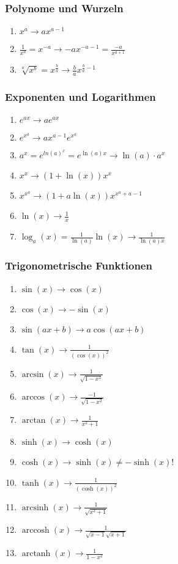 \documentclass[a4paper, 9pt, DIV=24]{scrartcl}
\DeclareMathOperator{\arcsinh}{arcsinh}
\DeclareMathOperator{\arccosh}{arccosh}
\DeclareMathOperator{\arctanh}{arctanh}
\begin{document}
\subsubsection{Polynome und Wurzeln}
\begin{enumerate}[label={(}\arabic*{)}]
 \item $x^a \rightarrow ax^{a-1}$
 \item $\frac{1}{x^a} = x^{-a} \rightarrow -ax^{-a-1} = \frac{-a}{x^{a+1}}$
 \item $\sqrt[a]{x^b} = x^{\frac{b}{a}} \rightarrow \frac{b}{a}x^{\frac{b}{a}-1}$
\end{enumerate}
\subsubsection{Exponenten und Logarithmen}
\begin{enumerate}[label={(}\arabic*{)}]
 \item $e^{ax} \rightarrow ae^{ax}$
 \item $e^{x^{a}} \rightarrow ax^{a-1}e^{x^{a}}$
 \item $a^{x} = e^{ln(a)^{x}} = e^{\ln(a)x} \rightarrow \ln(a)\cdot a^x$
 \item $x^{x} \rightarrow (1+\ln(x))x^{x}$
 \item $x^{x^a} \rightarrow (1+a\ln(x))x^{x^a+a-1}$
 \item $\ln(x) \rightarrow \frac{1}{x}$
 \item $\log_a(x) = \frac{1}{\ln(a)}\ln(x) \rightarrow \frac{1}{\ln(a)x}$
\end{enumerate}
\subsubsection{Trigonometrische Funktionen}
\begin{enumerate}[label={(}\arabic*{)}]
 \item $\sin(x) \rightarrow \cos(x)$
 \item $\cos(x) \rightarrow -\sin(x)$
 \item $\sin(ax+b) \rightarrow a\cos(ax+b)$
 \item $\tan(x) \rightarrow \frac{1}{(\cos(x))^2}$
 \item $\arcsin(x) \rightarrow \frac{1}{\sqrt{1-x^2}}$
 \item $\arccos(x) \rightarrow \frac{-1}{\sqrt{1-x^2}}$
 \item $\arctan(x) \rightarrow \frac{1}{x^2+1}$
 \item $\sinh(x) \rightarrow \cosh(x)$
 \item $\cosh(x) \rightarrow \sinh(x) \neq -\sinh(x)$!
 \item $\tanh(x) \rightarrow \frac{1}{(\cosh(x))^2}$
 \item $\arcsinh(x) \rightarrow \frac{1}{\sqrt{x^2+1}}$
 \item $\arccosh(x) \rightarrow \frac{1}{\sqrt{x-1}\sqrt{x+1}}$
 \item $\arctanh(x) \rightarrow \frac{1}{1-x^2}$
\end{enumerate}
\end{document}
